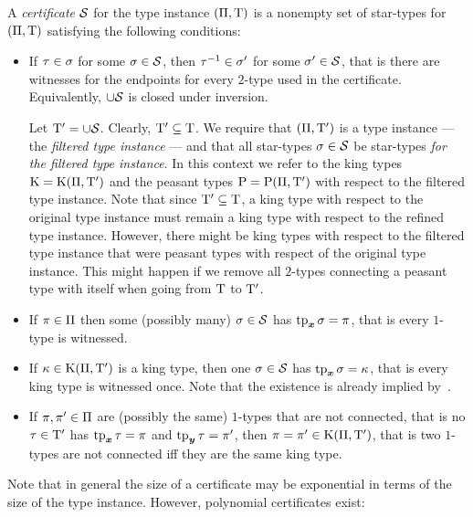 \begin{definition}
A \emph{certificate} $\mathcal{S}$ for the type instance $(\Pi,\mathrm{T})$ is a
nonempty set of star-types for $(\Pi,\mathrm{T})$ satisfying the following
conditions:
\begin{itemize}
  \item[\certcond1]\label{cond:cert-1} If $\tau\in\sigma$ for some
  $\sigma\in\mathcal{S}$, then $\tau^{-1}\in\sigma'$ for some $\sigma'\in\mathcal{S}$, that is there are witnesses
  for the endpoints for every $2$-type used in the certificate.
  Equivalently, $\cup\mathcal{S}$ is closed under inversion.
  
  Let ${\mathrm{T}'} = \cup\mathcal{S}$.
  Clearly, ${\mathrm{T}'}\subseteq\mathrm{T}$. We require that $(\Pi,{\mathrm{T}'})$ is a type
  instance --- the \emph{filtered type instance} --- and that all star-types
  $\sigma\in\mathcal{S}$ be star-types \emph{for the filtered type instance}.
  In this context we refer to the king types $\mathrm{K} = \mathrm{K}(\Pi,{\mathrm{T}'})$ and the
  peasant types $\mathrm{P} = \mathrm{P}(\Pi,{\mathrm{T}'})$ with respect to the filtered type
  instance. Note that since ${\mathrm{T}'} \subseteq \mathrm{T}$, a king type with respect
  to the original type instance must remain a king type with respect to the
  refined type instance. However, there might be king types with respect to the
  filtered type instance that were peasant types with respect of the original
  type instance. This might happen if we remove all $2$-types connecting a
  peasant type with itself when going from $\mathrm{T}$ to ${\mathrm{T}'}$.
  \item[\certcond2]\label{cond:cert-2} If $\pi \in \Pi$ then some (possibly
  many) $\sigma \in \mathcal{S}$ has $\operatorname{tp}_{\bm{x}}\sigma = \pi$, that is every $1$-type is witnessed.
  \item[\certcond3]\label{cond:cert-3} If $\kappa \in \mathrm{K}(\Pi,{\mathrm{T}'})$ is a king
  type, then one $\sigma \in \mathcal{S}$ has $\operatorname{tp}_{\bm{x}}\sigma = \kappa$, that is every king type is
  witnessed once.
  Note that the existence is already implied by~.
  \item[\certcond4]\label{cond:cert-4} If $\pi,{\pi'} \in \Pi$ are (possibly
  the same) $1$-types that are not connected, that is no $\tau\in{\mathrm{T}'}$ has $\operatorname{tp}_{\bm{x}}\tau
  = \pi$ and $\operatorname{tp}_{\bm{y}}\tau = {\pi'}$, then $\pi = {\pi'} \in
  \mathrm{K}(\Pi,{\mathrm{T}'})$, that is two $1$-types are not connected iff they are the
  same king type.
\end{itemize}
\end{definition}
Note that in general the size of a certificate may be exponential in terms of
the size of the type instance. However, polynomial certificates exist:

